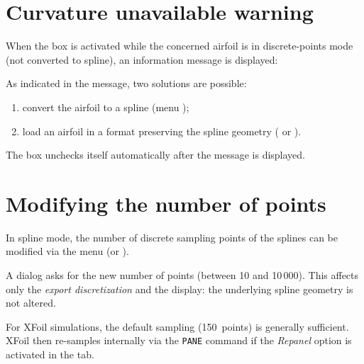 \section{\og Curvature unavailable \fg{} warning}

When the  box is activated while the concerned
airfoil is in discrete-points mode (not converted to spline),
an information message is displayed:


As indicated in the message, two solutions are possible:

\begin{enumerate}
    \item convert the airfoil to a spline (menu
        );
    \item load an airfoil in a format preserving the spline geometry
        ( or ).
\end{enumerate}

The box unchecks itself automatically after the message is
displayed.

\section{Modifying the number of points}

In spline mode, the number of discrete sampling points of the
splines can be modified via the  menu (or
).

A dialog asks for the new number of points (between 10 and
10\,000). This affects only the \emph{export discretization} and the
display: the underlying spline geometry is not altered.

\begin{noteinfo}
For XFoil simulations, the default sampling
(150~points) is generally sufficient. XFoil then re-samples
internally via the \texttt{PANE} command if the \emph{Repanel}
option is activated in the  tab.
\end{noteinfo}

